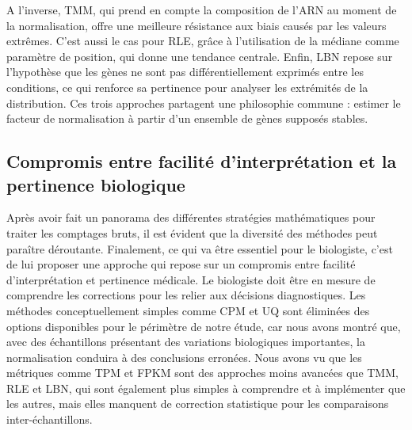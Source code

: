 A l'inverse, TMM, qui prend en compte la composition de l’ARN au moment de la normalisation, offre une meilleure résistance aux biais causés par les valeurs extrêmes\textsuperscript{\cite{robinson_scaling_2010}}. C'est aussi le cas pour RLE, grâce à l’utilisation de la médiane comme paramètre de position, qui donne une tendance centrale. Enfin, LBN repose sur l’hypothèse que les gènes ne sont pas différentiellement exprimés entre les conditions, ce qui renforce sa pertinence pour analyser les extrémités de la distribution. Ces trois approches partagent une philosophie commune : estimer le facteur de normalisation à partir d’un ensemble de gènes supposés stables.

\newpage \subsection{Compromis entre facilité d'interprétation et la pertinence biologique} \vspace{3mm}

Après avoir fait un panorama des différentes stratégies mathématiques pour traiter les comptages bruts, il est évident que la diversité des méthodes peut paraître déroutante. Finalement, ce qui va être essentiel pour le biologiste, c'est de lui proposer une approche qui repose sur un compromis entre facilité d'interprétation et pertinence médicale. Le biologiste doit être en mesure de comprendre les corrections pour les relier aux décisions diagnostiques. Les méthodes conceptuellement simples comme CPM et UQ sont éliminées des options disponibles pour le périmètre de notre étude, car nous avons montré que, avec des échantillons présentant des variations biologiques importantes, la normalisation conduira à des conclusions erronées. Nous avons vu que les métriques comme TPM et FPKM sont des approches moins avancées que TMM, RLE et LBN, qui sont également plus simples à comprendre et à implémenter que les autres, mais elles manquent de correction statistique pour les comparaisons inter-échantillons.\\

